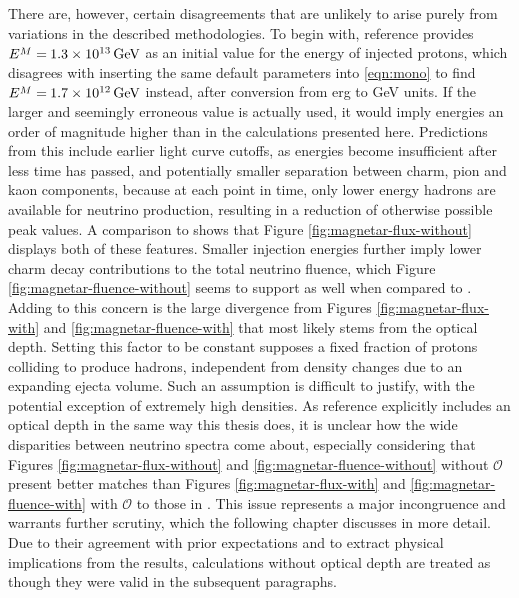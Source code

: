 There are, however, certain disagreements that are unlikely to arise purely from variations in the described methodologies. To begin with,
reference \cite{Carpio_2020} provides $\cramped{E^M} = \kern-0.5pt \smash{\qty{1.3e13}{\giga\electronvolt}}$ as an initial value for the
energy of injected protons, which disagrees with inserting the same default parameters into \eqref{eqn:mono} to find
$\cramped{E^M} = \kern-0.5pt \smash{\qty{1.7e12}{\giga\electronvolt}}$ instead, after conversion from \unit{erg} to \unit{\giga\electronvolt}
units. If the larger and seemingly erroneous value is actually used, it would imply energies an order of magnitude higher than in the
calculations presented here. Predictions from this include earlier light curve cutoffs, as energies become insufficient after less time
has passed, and potentially smaller separation between charm, pion and kaon components, because at each point in time, only lower
energy hadrons are available for neutrino production, resulting in a reduction of otherwise possible peak values. A comparison to
\cite{Carpio_2020} shows that Figure \ref{fig:magnetar-flux-without} displays both of these features. Smaller injection energies
further imply lower charm decay contributions to the total neutrino fluence, which Figure \ref{fig:magnetar-fluence-without} seems
to support as well when compared to \cite{Carpio_2020}. Adding to this concern is the large divergence from Figures
\ref{fig:magnetar-flux-with} and \ref{fig:magnetar-fluence-with} that most likely stems from the optical depth. Setting this
factor to be constant supposes a fixed fraction of protons colliding to produce hadrons, independent from density changes
due to an expanding ejecta volume. Such an assumption is difficult to justify, with the potential exception
of extremely high densities. As reference \cite{Carpio_2020} explicitly includes an optical depth in the same way
this thesis does, it is unclear how the wide disparities between neutrino spectra come about, especially
considering that Figures \ref{fig:magnetar-flux-without} and \ref{fig:magnetar-fluence-without} without $\mathscr{O}$ present
better matches than Figures \ref{fig:magnetar-flux-with} and \ref{fig:magnetar-fluence-with} with $\mathscr{O}$ to those in \cite{Carpio_2020}.
This issue represents a major incongruence and warrants further scrutiny, which the following chapter discusses in more detail. Due to their
agreement with prior expectations and to extract physical implications from the results, calculations without optical depth are treated as
though they were valid in the subsequent paragraphs.

